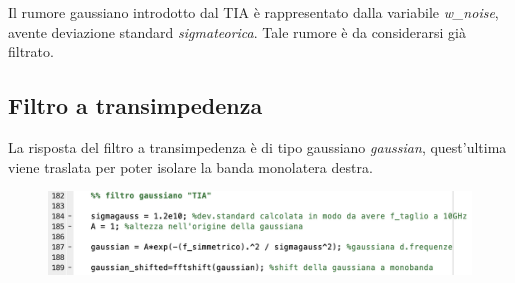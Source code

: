 \documentclass[12pt, a4paper]{article}
\begin{document}
Il rumore gaussiano introdotto dal TIA è rappresentato dalla variabile \textit{w\_noise}, avente deviazione standard \textit{sigmateorica}.  Tale rumore è da considerarsi già filtrato.


\newpage
\subsection{Filtro a transimpedenza}
\label{sub:TIA}

La risposta del filtro a transimpedenza è di tipo gaussiano \textit{gaussian}, quest'ultima viene traslata per poter isolare la banda monolatera destra.

\begin{figure}[h!]
\centering
\includegraphics[scale=0.7]{filtrogaussiano.png}
\label{}
\end{figure}
\end{document}
